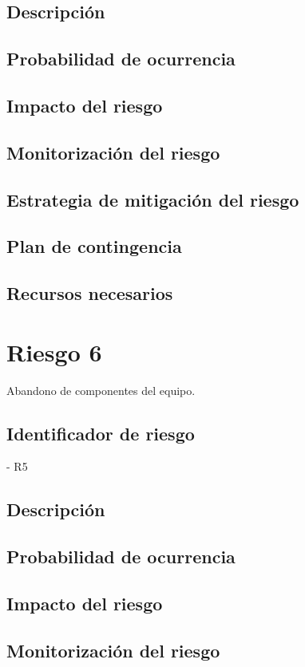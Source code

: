 \subsection{Descripción}
\subsection{Probabilidad de ocurrencia}
\subsection{Impacto del riesgo}
\subsection{Monitorización del riesgo}
\subsection{Estrategia de mitigación del riesgo}
\subsection{Plan de contingencia}
\subsection{Recursos necesarios}

\section{Riesgo 6}

Abandono de componentes del equipo.

\subsection{Identificador de riesgo}
- R5
\subsection{Descripción}
\subsection{Probabilidad de ocurrencia}
\subsection{Impacto del riesgo}
\subsection{Monitorización del riesgo}
